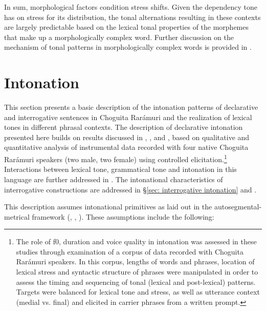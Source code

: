 In sum, morphological factors condition stress shifts. Given the dependency tone has on stress for its distribution, the tonal alternations resulting in these contexts are largely predictable based on the lexical tonal properties of the morphemes that make up a morphologically complex word. Further discussion on the mechanism of tonal patterns in morphologically complex words is provided in .

\section{Intonation}
\label{sec: intonation}

This section presents a basic description of the intonation patterns of declarative and interrogative sentences in Choguita Rarámuri and the realization of lexical tones in different phrasal contexts. The description of declarative intonation presented here builds on results discussed in \citet{caballero2014tone}, \citet{garellek2015lexical}, and \citet{kubuzono2020raramuri}, based on qualitative and quantitative analysis of instrumental data recorded with four native Choguita Rarámuri speakers (two male, two female) using controlled elicitation.\footnote{The role of f0, duration and voice quality in intonation was assessed in these studies through examination of a corpus of data recorded with Choguita Rarámuri speakers. In this corpus, lengths of words and phrases, location of lexical stress and syntactic structure of phrases were manipulated in order to assess the timing and sequencing of tonal (lexical and post-lexical) patterns. Targets were balanced for lexical tone and stress, as well as utterance context (medial vs. final) and elicited in carrier phrases from a written prompt.} Interactions between lexical tone, grammatical tone and intonation in this language are further addressed in . The intonational characteristics of interrogative constructions are addressed in §\ref{sec: interrogative intonation} and .



This description assumes intonational primitives as laid out in the autosegmen\-tal-metrical framework (\citealt{pierrehumbert1980phonology}, \citealt{beckman1986intonational}, \citealt{ladd1986intonational}). These assumptions include the following:

